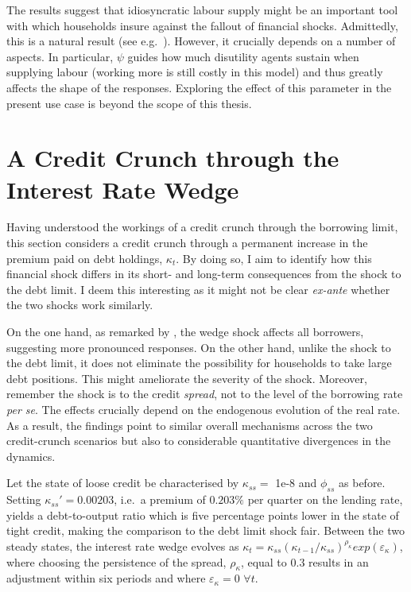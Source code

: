 \documentclass[a4paper,12pt]{article} %
\numberwithin{equation}{section} %
\numberwithin{figure}{section}
\numberwithin{table}{section}
\begin{document}
The results suggest that idiosyncratic labour supply might be an important tool with which households insure against the fallout of financial shocks. Admittedly, this is a natural result (see e.g.~\cite{heath2009}). However, it crucially depends on a number of aspects. In particular, $\psi$ guides how much disutility agents sustain when supplying labour (working more is still costly in this model) and thus greatly affects the shape of the responses. Exploring the effect of this parameter in the present use case is beyond the scope of this thesis.

\section{A Credit Crunch through the Interest Rate Wedge}
\label{sec:wedge}

Having understood the workings of a credit crunch through the borrowing limit, this section considers a credit crunch through a permanent increase in the premium paid on debt holdings, $\kappa_t$. By doing so, I aim to identify how this financial shock differs in its short- and long-term consequences from the shock to the debt limit. I deem this interesting as it might not be clear \textit{ex-ante} whether the two shocks work similarly.

On the one hand, as remarked by \textcite{gl2017}, the wedge shock affects all borrowers, suggesting more pronounced responses. On the other hand, unlike the shock to the debt limit, it does not eliminate the possibility for households to take large debt positions. This might ameliorate the severity of the shock. Moreover, remember the shock is to the credit \textit{spread}, not to the level of the borrowing rate \textit{per se}. The effects crucially depend on the endogenous evolution of the real rate. As a result, the findings point to similar overall mechanisms across the two credit-crunch scenarios but also to considerable quantitative divergences in the dynamics. 

Let the state of loose credit be characterised by $\kappa_{ss} =$ 1e-8 and $\phi_{ss}$ as before. Setting $\kappa_{ss}' = 0.00203$, i.e.~a premium of $0.203\%$ per quarter on the lending rate, yields a debt-to-output ratio which is five percentage points lower in the state of tight credit, making the comparison to the debt limit shock fair. Between the two steady states, the interest rate wedge evolves as $\kappa_t = \kappa_{ss} ( \kappa_{t-1} / \kappa_{ss} )^{\rho_{\kappa}} exp(\varepsilon_{\kappa})$, where choosing the persistence of the spread, $\rho_{\kappa}$, equal to $0.3$ results in an adjustment within six periods and where $\varepsilon_{\kappa} = 0$ $\forall t$.
\end{document}
